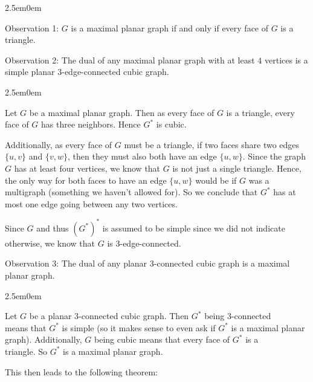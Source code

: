 \documentclass{book}
\newcommand{\hTwo}{%
   \color{MidnightBlue}%
   \fontsize{13}{15}\selectfont%
}
\newcommand{\hThree}{%
   \color{PineGreen}
   \fontsize{13}{15}\selectfont%
}
\newenvironment{myIndent}{%
   \begin{adjustwidth}{2.5em}{0em}%
}{%
   \end{adjustwidth}%
}
\newcommand{\retTwo}{\hfill\bigbreak}
\begin{document}
{\begin{myIndent}\hTwo
   Observation 1: $G$ is a maximal planar graph if and only if every face of $G$ is a triangle. \retTwo

   Observation 2: The dual of any maximal planar graph with at least $4$ vertices is a simple planar $3$-edge-connected cubic graph.
   {\begin{myIndent} \hThree
      Let $G$ be a maximal planar graph. Then as every face of $G$ is a triangle, every face of $G$ has three neighbors. Hence $G^*$ is cubic.\retTwo

      Additionally, as every face of $G$ must be a triangle, if two faces share two edges $\{u, v\}$ and $\{v, w\}$, then they must also both have an edge $\{u, w\}$. Since the graph $G$ has at least four vertices, we know that $G$ is not just a single triangle. Hence, the only way for both faces to have an edge $\{u, w\}$ would be if $G$ was a multigraph (something we haven't allowed for). So we conclude that $G^*$ has at most one edge going between any two vertices. \retTwo

      Since $G$ and thus $(G^*)^*$ is assumed to be simple since we did not indicate otherwise, we know that $G$ is $3$-edge-connected.\retTwo
   \end{myIndent}}

   Observation 3: The dual of any planar $3$-connected cubic graph is a maximal planar graph.

   {\begin{myIndent} \hThree
      Let $G$ be a planar $3$-connected cubic graph. Then $G^*$ being $3$-connected\\ means that $G^*$ is simple (so it makes sense to even ask if $G^*$ is a maximal planar graph). Additionally, $G$ being cubic means that every face of $G^*$ is a\\ triangle. So $G^*$ is a maximal planar graph.
      \retTwo
   \end{myIndent}}
\end{myIndent}}

This then leads to the following theorem:
\end{document}
